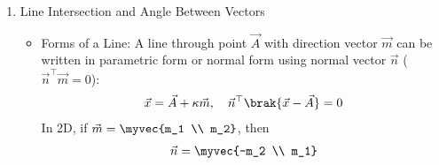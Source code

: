 \begin{enumerate}[label=\thesubsection.\arabic*, ref=\thesubsection.\theenumi,itemsep=0pt]
\begin{itemize}
\item Derivation of the Intersection Parameter:
Substituting $\vec{x} = \vec{h} + \kappa \vec{m}$ into the conic equation and using symmetry $\vec{V} = \vec{V}^\top$:
\begin{align}
\brak{\vec{h} + \kappa \vec{m}}^\top \vec{V} \brak{\vec{h} + \kappa \vec{m}} + 2\vec{u}^\top \brak{\vec{h} + \kappa \vec{m}} + f &= 0 \\
\kappa^2 \brak{\vec{m}^\top \vec{V} \vec{m}} + 2\kappa \vec{m}^\top \brak{\vec{V}\vec{h} + \vec{u}} + g\brak{\vec{h}} &= 0
\label{eq:quadk} %
\end{align}
When $\Delta = 0$, the two roots coincide and the line is tangent to the conic.

\item Pencil of Conics:
The intersection of two conics with parameters $\brak{\vec{V}_1, \vec{u}_1, f_1}$ and $\brak{\vec{V}_2, \vec{u}_2, f_2}$ lies on every member of the pencil:
\begin{align}
\vec{x}^\top \brak{\vec{V}_1 + \mu \vec{V}_2}\vec{x} + 2\brak{\vec{u}_1 + \mu \vec{u}_2}^\top \vec{x} + \brak{f_1 + \mu f_2} = 0
\label{eq:pencil} %
\end{align}

\item Degenerate Conic and Common Chord:
The pencil represents a pair of straight lines (a degenerate conic) if and only if:
\begin{align}
\mydet{\vec{V}_1 + \mu \vec{V}_2 & \vec{u}_1 + \mu \vec{u}_2 \\ \brak{\vec{u}_1 + \mu \vec{u}_2}^\top & f_1 + \mu f_2} = 0
\label{eq:degen} %
\end{align}
If $\vec{V}_1 = \vec{V}_2$ (e.g., two circles), choosing $\mu = -1$ removes the second-degree terms, leaving the common chord (radical axis):
\begin{align}
2\brak{\vec{u}_1 - \vec{u}_2}^\top \vec{x} + \brak{f_1 - f_2} = 0
\label{eq:chord} %
\end{align}
\end{itemize}

\item Line Intersection and Angle Between Vectors
\begin{itemize}
\item Forms of a Line:
A line through point $\vec{A}$ with direction vector $\vec{m}$ can be written in parametric form or normal form using normal vector $\vec{n}$ ($\vec{n}^\top \vec{m} = 0$):
\begin{align}
\vec{x} = \vec{A} + \kappa \vec{m}, \quad \vec{n}^\top \brak{\vec{x} - \vec{A}} = 0
\label{eq:lineform} %
\end{align}
In 2D, if $\vec{m} = \myvec{m_1 \\ m_2}$, then
\begin{align} %
\vec{n} = \myvec{-m_2 \\ m_1}
\label{eq:normal} %
\end{align}


\end{itemize}
\end{enumerate}
